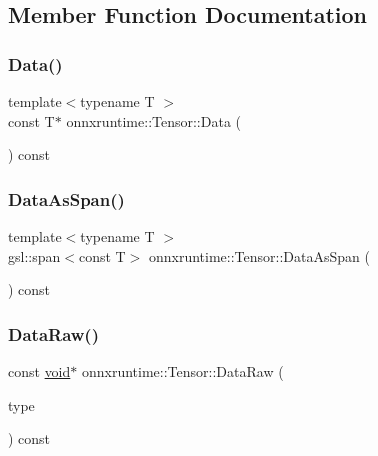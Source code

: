 \subsection{Member Function Documentation}
\mbox{\label{classonnxruntime_1_1Tensor_a76c100a2c7ae207975364f569fe69edb}} 
\subsubsection{\texorpdfstring{Data()}{Data()}}
{\footnotesize\ttfamily template$<$typename T $>$ \\
const T$\ast$ onnxruntime\+::\+Tensor\+::\+Data (\begin{DoxyParamCaption}{ }\end{DoxyParamCaption}) const\hspace{0.3cm}{\ttfamily [inline]}}

\mbox{\label{classonnxruntime_1_1Tensor_a503b297f9a6945f66c957f9fe9bc60b8}} 
\subsubsection{\texorpdfstring{Data\+As\+Span()}{DataAsSpan()}}
{\footnotesize\ttfamily template$<$typename T $>$ \\
gsl\+::span$<$const T$>$ onnxruntime\+::\+Tensor\+::\+Data\+As\+Span (\begin{DoxyParamCaption}{ }\end{DoxyParamCaption}) const\hspace{0.3cm}{\ttfamily [inline]}}

\mbox{\label{classonnxruntime_1_1Tensor_a347043b45cb4624679996650de575303}} 
\subsubsection{\texorpdfstring{Data\+Raw()}{DataRaw()}\hspace{0.1cm}{\footnotesize\ttfamily [1/2]}}
{\footnotesize\ttfamily const \mbox{\hyperlink{mlasi_8h_a88f941d423cb2a819b70a1358982b1a6}{void}}$\ast$ onnxruntime\+::\+Tensor\+::\+Data\+Raw (\begin{DoxyParamCaption}\item[{\mbox{\hyperlink{namespaceonnxruntime_ad77d0a6e838ec7da5dc35fed5ee66b49}{M\+L\+Data\+Type}}}]{type }\end{DoxyParamCaption}) const\hspace{0.3cm}{\ttfamily [inline]}}

